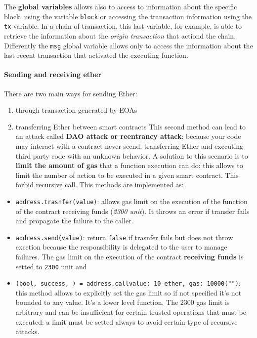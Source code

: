 \documentclass[10pt,a4paper]{report}
\begin{document}
	The \textbf{global variables} allows also to access to information about the specific block, using the variable \texttt{block} or accessing the transaction information using the \texttt{tx} variable. In a chain of transaction, this last variable, for example, is able to retrieve the information about the \textit{origin transaction} that actiond the chain. Differently the \texttt{msg} global variable allows only to access the information about the last recent transaction that activated the executing function.
	\paragraph{Sending and receiving ether}\label{sec:sending-and-receiving-ether}
	There are two main ways for sending Ether:
	\begin{enumerate}
		\item 
		through transaction generated by EOAs
		\item 
		transferring Ether between smart contracts
		This second method can lead to an attack called \textbf{DAO attack or reentrancy attack}: because your code may interact with a contract never seend, transferring Ether and executing third party code with an unknown behavior.
		A solution to this scenario is to \textbf{limit the amount of gas} that a function execution can do: this allows to limit the number of action to be executed in a given smart contract. This forbid recursive call.
		This methods are implemented as:
	\end{enumerate}
	\begin{itemize}
		\item 
		\texttt{address.trasnfer(value)}: allows gas limit on the execution of the function of the contract receiving funds (\textit{2300 unit}). It throws an error if transfer fails and propagate the failure to the caller.
		\item 
		\texttt{address.send(value)}: return \texttt{false} if trasnfer fails but does not throw excetion because the responsibility is delegated to the user to manage failures. The gas limit on the execution of the contract \textbf{receiving funds} is setted to \texttt{2300} unit and
		\item 
		\texttt{(bool, success, ) = address.call{value: 10 ether, gas: 10000}("")}: this method allows to explicitly set the gas limit so if not specified it's not bounded to any value. It's a lower level function.
		The $2300$ gas limit is arbitrary and can be insufficient for certain trusted operations that must be executed: a limit must be setted always to avoid certain type of recursive attacks.
	\end{itemize}
	
\end{document}
